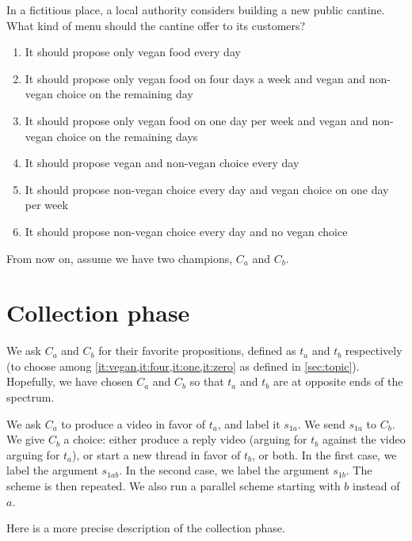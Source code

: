 \documentclass[version=3.21, pagesize, twoside=off, bibliography=totoc, DIV=calc, fontsize=12pt, a4paper]{scrartcl}
\begin{document}
In a fictitious place, a local authority considers building a new public cantine. What kind of menu should the cantine offer to its customers?
\begin{enumerate}
	\item \label{it:vegan} It should propose only vegan food every day
	\item \label{it:four} It should propose only vegan food on four days a week and vegan and non-vegan choice on the remaining day
	\item \label{it:one} It should propose only vegan food on one day per week and vegan and non-vegan choice on the remaining days
	\item \label{it:zero} It should propose vegan and non-vegan choice every day
	\item It should propose non-vegan choice every day and vegan choice on one day per week
	\item It should propose non-vegan choice every day and no vegan choice
\end{enumerate}

From now on, assume we have two champions, $C_a$ and $C_b$.

\section{Collection phase}
We ask $C_a$ and $C_b$ for their favorite propositions, defined as $t_a$ and $t_b$ respectively (to choose among \cref{it:vegan,it:four,it:one,it:zero} as defined in \cref{sec:topic}). Hopefully, we have chosen $C_a$ and $C_b$ so that $t_a$ and $t_b$ are at opposite ends of the spectrum. 

We ask $C_a$ to produce a video in favor of $t_a$, and label it $s_{1a}$. We send $s_{1a}$ to $C_b$. We give $C_b$ a choice: either produce a reply video (arguing for $t_b$ against the video arguing for $t_a$), or start a new thread in favor of $t_b$, or both. In the first case, we label the argument $s_{1ab}$. In the second case, we label the argument $s_{1b}$. The scheme is then repeated. We also run a parallel scheme starting with $b$ instead of $a$.

Here is a more precise description of the collection phase.
\end{document}
